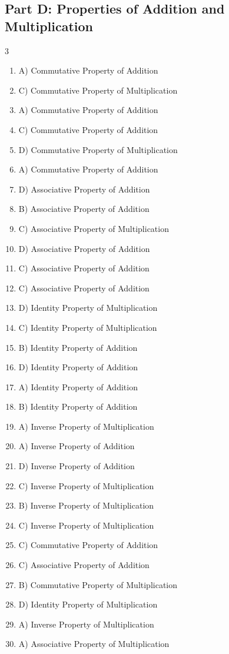 \documentclass[11pt]{article}
\begin{document}
\subsection*{Part D: Properties of Addition and Multiplication}
\begin{multicols}{3}
\begin{enumerate}
  \item A) Commutative Property of Addition
  \item C) Commutative Property of Multiplication
  \item A) Commutative Property of Addition
  \item C) Commutative Property of Addition
  \item D) Commutative Property of Multiplication
  \item A) Commutative Property of Addition
  \item D) Associative Property of Addition
  \item B) Associative Property of Addition
  \item C) Associative Property of Multiplication
  \item D) Associative Property of Addition
  \item C) Associative Property of Addition
  \item C) Associative Property of Addition
  \item D) Identity Property of Multiplication
  \item C) Identity Property of Multiplication
  \item B) Identity Property of Addition
  \item D) Identity Property of Addition
  \item A) Identity Property of Addition
  \item B) Identity Property of Addition
  \item A) Inverse Property of Multiplication
  \item A) Inverse Property of Addition
  \item D) Inverse Property of Addition
  \item C) Inverse Property of Multiplication
  \item B) Inverse Property of Multiplication
  \item C) Inverse Property of Multiplication
  \item C) Commutative Property of Addition
  \item C) Associative Property of Addition
  \item B) Commutative Property of Multiplication
  \item D) Identity Property of Multiplication
  \item A) Inverse Property of Multiplication
  \item A) Associative Property of Multiplication
\end{enumerate}
\end{multicols}
\end{document}
